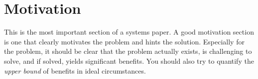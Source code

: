 \section{Motivation}\label{sec:motivation}

This is the most important section of a systems paper.
A good motivation section is one that clearly motivates the problem and hints the solution.
Especially for the problem, it should be clear that the problem actually exists, is challenging to solve, and if solved, yields significant benefits.
You should also try to quantify the \emph{upper bound} of benefits in ideal circumstances.

